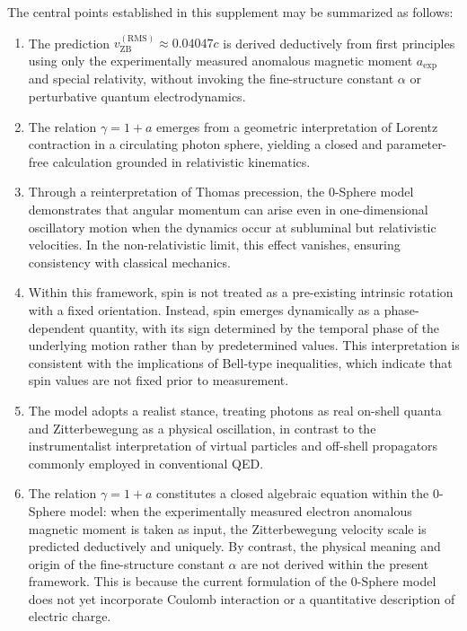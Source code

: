 \documentclass[12pt,letterpaper]{article}
\begin{document}
The central points established in this supplement may be summarized as follows:

\begin{enumerate}
\item The prediction $v_{\mathrm{ZB}}^{(\mathrm{RMS})} \approx 0.04047c$ is derived deductively from first principles using only the experimentally measured anomalous magnetic moment $a_{\mathrm{exp}}$ and special relativity, without invoking the fine-structure constant $\alpha$ or perturbative quantum electrodynamics.

\item The relation $\gamma = 1 + a$ emerges from a geometric interpretation of Lorentz contraction in a circulating photon sphere, yielding a closed and parameter-free calculation grounded in relativistic kinematics.

\item Through a reinterpretation of Thomas precession, the 0-Sphere model demonstrates that angular momentum can arise even in one-dimensional oscillatory motion when the dynamics occur at subluminal but relativistic velocities. In the non-relativistic limit, this effect vanishes, ensuring consistency with classical mechanics.

\item Within this framework, spin is not treated as a pre-existing intrinsic rotation with a fixed orientation. Instead, spin emerges dynamically as a phase-dependent quantity, with its sign determined by the temporal phase of the underlying motion rather than by predetermined values. This interpretation is consistent with the implications of Bell-type inequalities, which indicate that spin values are not fixed prior to measurement.

\item The model adopts a realist stance, treating photons as real on-shell quanta and Zitterbewegung as a physical oscillation, in contrast to the instrumentalist interpretation of virtual particles and off-shell propagators commonly employed in conventional QED.

\item The relation $\gamma = 1 + a$ constitutes a closed algebraic equation within the 0-Sphere model: when the experimentally measured electron anomalous magnetic moment is taken as input, the Zitterbewegung velocity scale is predicted deductively and uniquely. By contrast, the physical meaning and origin of the fine-structure constant $\alpha$ are not derived within the present framework. This is because the current formulation of the 0-Sphere model does not yet incorporate Coulomb interaction or a quantitative description of electric charge.


\end{enumerate}
\end{document}
